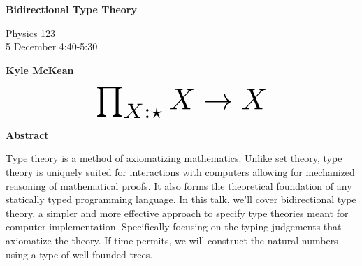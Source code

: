 \documentclass{article}
\begin{document}
\thispagestyle{plain}
\begin{center}
    \Large
    \textbf{Bidirectional Type Theory}
    
    \vspace{0.4cm}
    \large
    Physics 123 \\
    5 December 4:40-5:30
    
    \vspace{0.4cm}
    \textbf{Kyle McKean}


    \begin{equation*}
      \scalebox{3}{
        $\prod_{X : \star} X \rightarrow X$
      }
    \end{equation*}
    
    \vspace{0.4cm}
    \textbf{Abstract}
\end{center}
Type theory is a method of axiomatizing mathematics. Unlike set theory, type
theory is uniquely suited for interactions with computers allowing
for mechanized reasoning of mathematical proofs. It also forms the theoretical foundation
of any statically typed programming language. In this talk, we'll cover
bidirectional type theory, a simpler and more effective approach to specify type
theories meant for computer implementation. Specifically focusing on the typing
judgements that axiomatize the theory. If time permits, we will construct
the natural numbers using a type of well founded trees.
\end{document}
